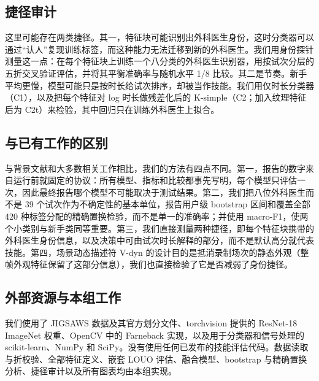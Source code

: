 \subsection{捷径审计}

这里可能存在两类捷径。其一，特征块可能识别出外科医生身份，这时分类器可以通过“认人”复现训练标签，而这种能力无法迁移到新的外科医生。我们用身份探针测量这一点：在每个特征块上训练一个八分类的外科医生识别器，用按试次分层的五折交叉验证评估，并将其平衡准确率与随机水平 1/8 比较。其二是节奏。新手平均更慢，模型可能只是按时长给试次排序，却被当作技能。我们用仅时长分类器（C1），以及把每个特征对 log 时长做残差化后的 K-simple（C2；加入纹理特征后为 C2t）来检验，其中回归只在训练外科医生上拟合。

\subsection{与已有工作的区别}
\label{sec:differences}

与背景文献和大多数相关工作相比，我们的方法有四点不同。第一，报告的数字来自运行前就固定的协议：所有模型、指标和比较都事先写明，每个模型只评估一次，因此最终报告哪个模型不可能取决于测试结果。第二，我们把八位外科医生而不是 39 个试次作为不确定性的基本单位，报告用户级 bootstrap 区间和覆盖全部 420 种标签分配的精确置换检验，而不是单一的准确率；并使用 macro-F1，使两个小类别与新手类同等重要。第三，我们直接测量两种捷径，即每个特征块携带的外科医生身份信息，以及决策中可由试次时长解释的部分，而不是默认高分就代表技能。第四，场景动态描述符 V-dyn 的设计目的是抵消录制场次的静态外观（整帧外观特征保留了这部分信息），我们也直接检验了它是否减弱了身份捷径。

\subsection{外部资源与本组工作}

我们使用了 JIGSAWS 数据及其官方划分文件、torchvision 提供的 ResNet-18 ImageNet 权重\citep{paszke2019pytorch}、OpenCV 中的 Farneback 实现\citep{bradski2000opencv}，以及用于分类器和信号处理的 scikit-learn\citep{pedregosa2011sklearn}、NumPy\citep{harris2020numpy} 和 SciPy\citep{virtanen2020scipy}。没有使用任何已发布的技能评估代码。数据读取与折校验、全部特征定义、嵌套 LOUO 评估、融合模型、bootstrap 与精确置换分析、捷径审计以及所有图表均由本组实现。
